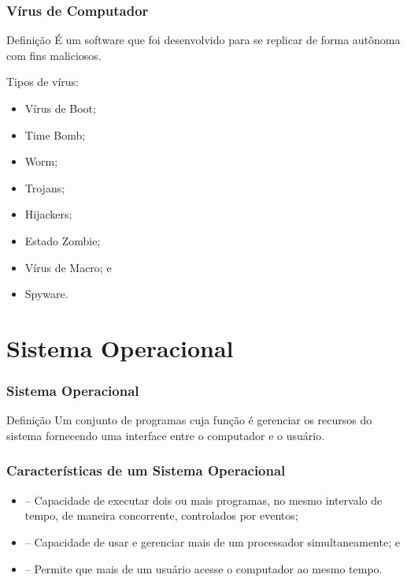 \documentclass[aspectratio=169]{beamer} %
\begin{document}
\begin{frame}
	\frametitle{Vírus de Computador}

	\begin{block}{Defini\c cão}
		É um software que foi desenvolvido para se replicar de forma autônoma com fins maliciosos.
	\end{block}\vfill
		
	Tipos de vírus:
	\begin{itemize}
		\item Vírus de Boot;
		\item Time Bomb;
		\item Worm;
		\item Trojans;
		\item Hijackers;
		\item Estado Zombie;
		\item Vírus de Macro; e
		\item Spyware.
	\end{itemize}
\end{frame}

\section{Sistema Operacional}

\begin{frame}
	\frametitle{Sistema Operacional}
	
	\begin{block}{Defini\c cão}
		Um conjunto de programas cuja função é gerenciar os recursos do sistema fornecendo uma interface entre o computador e o usuário.
	\end{block}
\end{frame}

\begin{frame}
	\frametitle{Características de um Sistema Operacional}
		
	\begin{itemize}
		\item {}  – Capacidade de executar dois ou mais programas, no mesmo intervalo de tempo, de maneira concorrente, controlados por eventos;
		\item {} – Capacidade de usar e gerenciar mais de um processador simultaneamente; e
		\item {} – Permite que mais de um usuário acesse o computador ao mesmo tempo.
	\end{itemize}
\end{frame}
\end{document}
